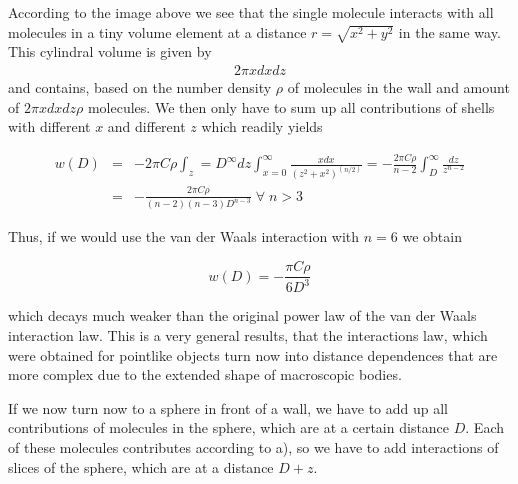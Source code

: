 \documentclass[letterpaper,10pt,english]{sphinxmanual}
\let\sphinxpxdimen\pdfpxdimen\else\newdimen\sphinxpxdimen
\begin{document}
\sphinxAtStartPar
{}

\noindent\sphinxincludegraphics[width=411\sphinxpxdimen,height=436\sphinxpxdimen]{{molecule_body}.png}

\sphinxAtStartPar
According to the image above we see that the single molecule interacts with all molecules in a tiny volume element at a distance \(r=\sqrt{x^2+y^2}\) in the same way. This cylindral volume is given by
\begin{equation*}
\begin{split}2\pi x dx dz\end{split}
\end{equation*}
\sphinxAtStartPar
and contains, based on the number density \(\rho\) of molecules in the wall and amount of \(2\pi x dx dz\rho\) molecules. We then only have to sum up all contributions of shells with different \(x\) and different \(z\) which readily yields

\sphinxAtStartPar
\begin{eqnarray}
w(D)&=&-2\pi C\rho\int_z=D^{\infty} dz \int_{x=0}^{\infty}\frac{x dx}{(z^2+x^2)^(n/2)}=-\frac{2\pi C \rho}{n-2}\int_{D}^{\infty}\frac{dz}{z^{n-2}}\\
&=&-\frac{2\pi C \rho}{(n-2)(n-3)D^{n-3}}\; \forall\; n>3
\end{eqnarray}

\sphinxAtStartPar
Thus, if we would use the van der Waals interaction with \(n=6\) we obtain

\sphinxAtStartPar
\begin{equation}
w(D)=-\frac{\pi C \rho}{6D^3}
\end{equation}

\sphinxAtStartPar
which decays much weaker than the original power law of the van der Waals interaction law. This is a very general results, that the interactions law, which were obtained for point\sphinxhyphen{}like objects turn now into distance dependences that are more complex due to the extended shape of macroscopic bodies.

\sphinxAtStartPar
{}

\sphinxAtStartPar
If we now turn now to a sphere in front of a wall, we have to add up all contributions of molecules in the sphere, which are at a certain distance \(D\). Each of these molecules contributes according to a), so we have to add interactions of slices of the sphere, which are at a distance \(D+z\).
\end{document}
